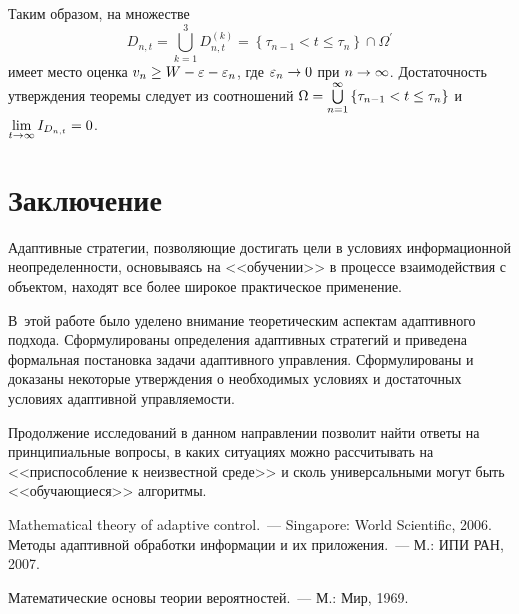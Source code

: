 \begin{multicols}{2}
\pagebreak
  
  Таким образом, на множестве
  $$
  D_{n,t}=\bigcup\limits_{k=1}^3 D_{n,t}^{(k)} = \left\{ \tau_{n-1}<t\leq \tau_n\right\} \cap 
\Omega^\prime
  $$
имеет место оценка $v_n\hm\geq W-\varepsilon-\varepsilon_n$, где 
$\varepsilon_n\hm\rightarrow 0$ при $n\hm\rightarrow\infty$. Достаточность утверждения 
теоремы следует из соотношений $\Omega\hm= \bigcup\limits_{n=1}^\infty \left\{ \tau_{n-
1}\hm<t\hm\leq \tau_n\right\}$ и $\lim\limits_{t\rightarrow\infty} I_{D_{n,t}}\hm=0$.

\section{Заключение}

  Адаптивные стратегии, позволяющие достигать цели в условиях информационной 
неопреде\-лен\-ности, основываясь на <<обучении>> в процессе взаимодействия с объектом, 
находят все более широкое практическое применение. 

В~этой работе было уделено 
внимание теоретическим аспектам адаптивного подхода. Сформулированы определения 
адаптивных стратегий и приведена формальная постановка задачи адаптивного 
управления. Сформулированы и доказаны некоторые утверждения о необходимых 
условиях и достаточных условиях адап\-тив\-ной управляемости. 

Продолжение исследований 
в данном на\-прав\-ле\-нии позволит найти ответы на принципиальные вопросы, в каких 
ситуациях можно рассчитывать на <<приспособление к неизвестной среде>> и сколь 
универсальными могут быть <<обучающиеся>> алгоритмы.



{\small\frenchspacing
{%
\begin{thebibliography}{9}


  Mathematical theory of adaptive control.~--- Singapore: World Scientific, 2006.
  Методы адаптивной обработки информации и их приложения.~--- М.: ИПИ РАН, 2007.
  
  \label{end\stat}
  
  Математические основы теории вероятностей.~--- М.: Мир, 1969.
\end{thebibliography}
}
}


\end{multicols}